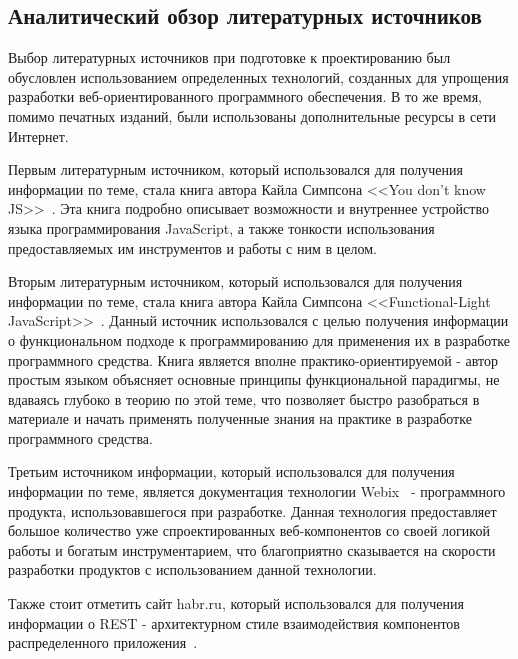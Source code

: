 \subsection{Аналитический обзор литературных источников}
\label{sec:analysis:literature}

Выбор литературных источников при подготовке к проектированию был обусловлен использованием определенных технологий, созданных для упрощения разработки веб-ориентированного программного обеспечения. В то же время, помимо печатных изданий, были использованы дополнительные ресурсы в сети Интернет.

Первым литературным источником, который использовался для получения информации по теме, стала книга автора Кайла Симпсона <<You don’t know JS>>~\cite{u_dont_know_js}. Эта книга подробно описывает возможности и внутреннее устройство языка программирования JavaScript, а также тонкости использования предоставляемых им инструментов и работы с ним в целом. 

Вторым литературным источником, который использовался для получения информации по теме, стала книга автора Кайла Симпсона <<Functional-Light JavaScript>>~\cite{func_light_js}. Данный источник использовался с целью получения информации о функциональном подходе к программированию для применения их в разработке программного средства. Книга является вполне практико-ориентируемой - автор простым языком объясняет основные принципы функциональной парадигмы, не вдаваясь глубоко в теорию по этой теме, что позволяет быстро разобраться в материале и начать применять полученные знания на практике в разработке программного средства.

Третьим источником информации, который использовался для получения информации по теме, является документация технологии Webix~\cite{webix_docs} - программного продукта, использовавшегося при разработке. Данная технология предоставляет большое количество уже спроектированных веб-компонентов со своей логикой работы и богатым инструментарием, что благоприятно сказывается на скорости разработки продуктов с использованием данной технологии.

Также стоит отметить сайт habr.ru, который использовался для получения информации о REST - архитектурном стиле взаимодействия компонентов распределенного приложения~\cite{wiki_rest}.